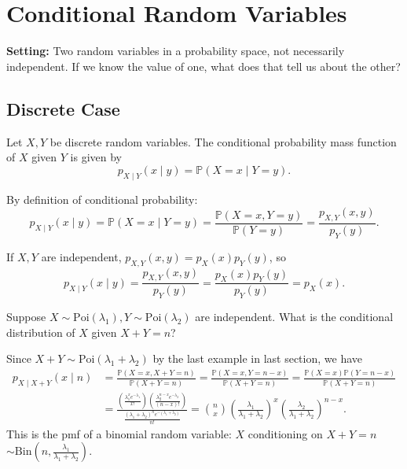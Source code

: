 \chapter{Conditional Random Variables}
\textbf{Setting:} Two random variables in a probability space, not necessarily independent. If we know the value of one, what does that tell us about the other?

\section{Discrete Case}
\begin{definition}
    Let \(X, Y\) be discrete random variables. The conditional probability mass function of \(X\) given \(Y\) is given by 
    \[
        p_{X \mid Y} (x \mid y) = \mathbb{P} (X = x \mid Y = y).
    \]   
\end{definition}

By definition of conditional probability:
\[
    p_{X \mid Y}(x \mid y) = \mathbb{P} (X = x \mid Y = y) = \frac{\mathbb{P} (X = x, Y = y)}{\mathbb{P} (Y = y)} = \frac{p_{X, Y}(x, y)}{p_Y(y)}.
\]

If \(X, Y\) are independent, \(p_{X, Y}(x, y) = p_X(x) p_Y(y) \), so 
\[
    p_{X \mid Y} (x \mid y) = \frac{p_{X, Y}(x, y)}{p_Y(y)} = \frac{p_X(x) p_Y(y)}{p_Y(y)} = p_X(x).
\]

\begin{eg}
    Suppose \(X \sim \mathrm{Poi} (\lambda _1), Y \sim \mathrm{Poi}(\lambda _2)  \) are independent. What is the conditional distribution of \(X\) given \(X + Y = n\)?  
\end{eg}

\begin{explanation}
    Since \(X+Y \sim \mathrm{Poi}(\lambda _1 + \lambda _2) \) by the last example in last section, we have 
    \begin{align*}
        p_{X \mid X + Y}(x \mid n) &= \frac{\mathbb{P} (X = x, X + Y = n)}{\mathbb{P} (X + Y = n)} = \frac{\mathbb{P} (X = x, Y = n - x)}{\mathbb{P} (X + Y = n)} = \frac{\mathbb{P} (X = x) \mathbb{P} (Y = n - x)}{\mathbb{P} (X + Y = n)} \\
        &= \frac{\left( \frac{\lambda _1^x e^{-\lambda _1}}{x!} \right) \left( \frac{\lambda _2^{n - x} e^{-\lambda _2}}{(n - x)!} \right)  }{\frac{(\lambda _1 + \lambda _2)^n e^{-(\lambda _1 + \lambda _2)}}{n!}} = \binom{n}{x} \left( \frac{\lambda _1}{\lambda _1 + \lambda _2} \right)^x \left( \frac{\lambda _2}{\lambda _1 + \lambda _2} \right)^{n-x}.  
    \end{align*}
    This is the pmf of a binomial random variable: \(X\) conditioning on \(X + Y = n\) \(\sim \mathrm{Bin}\left( n, \frac{\lambda _1}{\lambda _1 + \lambda _2} \right)  \).    
\end{explanation}

